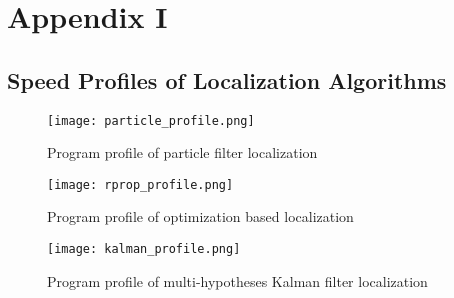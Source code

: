 \chapter{Appendix I}\label{testdat}

\section{Speed Profiles of Localization Algorithms}
\begin{figure}[h!]
  \texttt{[image: particle\_profile.png]}
    \caption{Program profile of particle filter localization}
    \label{fig:profile_partcile}
\end{figure}

\begin{figure}[h!]
  \texttt{[image: rprop\_profile.png]}
    \caption{Program profile of optimization based localization}
    \label{fig:profile_rprop}
\end{figure}

\begin{figure}[h!]
  \texttt{[image: kalman\_profile.png]}
    \caption{Program profile of multi-hypotheses Kalman filter localization}
    \label{fig:profile_kalman}
\end{figure}


